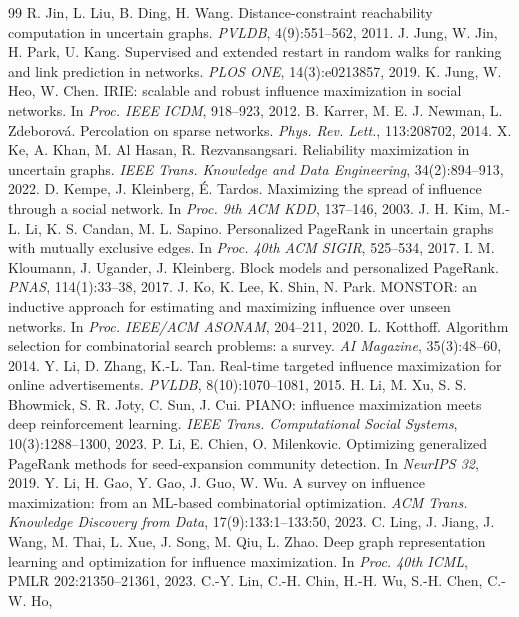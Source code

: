 \documentclass[11pt,a4paper]{article}
\begin{document}
\begin{thebibliography}{99}
 R. Jin, L. Liu, B. Ding, H. Wang. Distance-constraint
reachability computation in uncertain graphs. \emph{PVLDB}, 4(9):551--562, 2011.
 J. Jung, W. Jin, H. Park, U. Kang. Supervised and extended
restart in random walks for ranking and link prediction in networks.
\emph{PLOS ONE}, 14(3):e0213857, 2019.
 K. Jung, W. Heo, W. Chen. IRIE: scalable and robust influence
maximization in social networks. In \emph{Proc. IEEE ICDM}, 918--923, 2012.
 B. Karrer, M. E. J. Newman, L. Zdeborov\'a. Percolation on sparse
networks. \emph{Phys. Rev. Lett.}, 113:208702, 2014.
 X. Ke, A. Khan, M. Al Hasan, R. Rezvansangsari. Reliability
maximization in uncertain graphs. \emph{IEEE Trans. Knowledge and Data
Engineering}, 34(2):894--913, 2022.
 D. Kempe, J. Kleinberg, \'E. Tardos. Maximizing the spread of
influence through a social network. In \emph{Proc. 9th ACM KDD}, 137--146, 2003.
 J. H. Kim, M.-L. Li, K. S. Candan, M. L. Sapino. Personalized
PageRank in uncertain graphs with mutually exclusive edges. In \emph{Proc. 40th
ACM SIGIR}, 525--534, 2017.
 I. M. Kloumann, J. Ugander, J. Kleinberg. Block models
and personalized PageRank. \emph{PNAS}, 114(1):33--38, 2017.
 J. Ko, K. Lee, K. Shin, N. Park. MONSTOR: an inductive
approach for estimating and maximizing influence over unseen networks. In
\emph{Proc. IEEE/ACM ASONAM}, 204--211, 2020.
 L. Kotthoff. Algorithm selection for combinatorial search
problems: a survey. \emph{AI Magazine}, 35(3):48--60, 2014.
 Y. Li, D. Zhang, K.-L. Tan. Real-time targeted influence
maximization for online advertisements. \emph{PVLDB}, 8(10):1070--1081, 2015.
 H. Li, M. Xu, S. S. Bhowmick, S. R. Joty, C. Sun, J. Cui.
PIANO: influence maximization meets deep reinforcement learning. \emph{IEEE
Trans. Computational Social Systems}, 10(3):1288--1300, 2023.
 P. Li, E. Chien, O. Milenkovic. Optimizing generalized
PageRank methods for seed-expansion community detection. In \emph{NeurIPS
32}, 2019.
 Y. Li, H. Gao, Y. Gao, J. Guo, W. Wu. A survey on
influence maximization: from an ML-based combinatorial optimization.
\emph{ACM Trans. Knowledge Discovery from Data}, 17(9):133:1--133:50, 2023.
 C. Ling, J. Jiang, J. Wang, M. Thai, L. Xue, J. Song,
M. Qiu, L. Zhao. Deep graph representation learning and optimization for
influence maximization. In \emph{Proc. 40th ICML}, PMLR 202:21350--21361,
2023.
 C.-Y. Lin, C.-H. Chin, H.-H. Wu, S.-H. Chen, C.-W. Ho,

\end{thebibliography}
\end{document}

